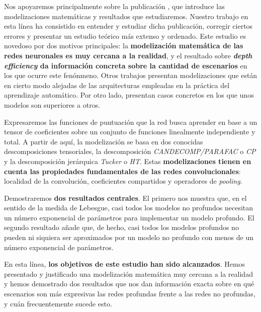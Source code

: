 Nos apoyaremos principalmente sobre la publicación \cite{matematicas:principal}, que introduce las modelizaciones matemáticas y resultados que estudiaremos. Nuestro trabajo en esta línea ha consistido en entender y estudiar dicha publicación, corregir ciertos errores y presentar un estudio teórico más extenso y ordenado. Este estudio es novedoso por dos motivos principales: la \textbf{modelización matemática de las redes neuronales es muy cercana a la realidad}, y el resultado sobre \textbf{\textit{depth efficiency} da información concreta sobre la cantidad de escenarios} en los que ocurre este fenónmeno. Otros trabajos presentan modelizaciones que están en cierto modo alejadas de las arquitecturas empleadas en la práctica del aprendizaje automático. Por otro lado, presentan casos concretos en los que unos modelos son superiores a otros.

Expresaremos las funciones de puntuación que la red busca aprender en base a un tensor de coeficientes sobre un conjunto de funciones linealmente independiente y total. A partir de aquí, la modelización se basa en dos conocidas descomposiciones tensoriales, la descomposición \textit{CANDECOMP/PARAFAC} o \textit{CP} y la descomposición jerárquica \textit{Tucker} o \textit{HT}. Estas \textbf{modelizaciones tienen en cuenta las propiedades fundamentales de las redes convolucionales}: localidad de la convolución, coeficientes compartidos y operadores de \textit{pooling}.

Demostraremos \textbf{dos resultados centrales}. El primero nos muestra que, en el sentido de la medida de Lebesgue, casi todos los modelos no profundos necesitan un número exponencial de parámetros para implementar un modelo profundo. El segundo resultado añade que, de hecho, casi todos los modelos profundos no pueden ni siquiera ser aproximados por un modelo no profundo con menos de un número exponencial de parámetros.

En esta línea, \textbf{los objetivos de este estudio han sido alcanzados}. Hemos presentado y justificado una modelización matemática muy cercana a la realidad y hemos demostrado dos resultados que nos dan información exacta sobre en qué escenarios son más expresivas las redes profundas frente a las redes no profundas, y cuán frecuentemente sucede esto.

